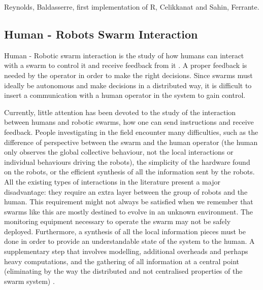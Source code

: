 \documentclass[oneside, a4paper, 12pt]{memoir}
\begin{document}
		
		Reynolds, Baldasserre, first implementation of R, Celikkanat and Sahin, Ferrante.
			
	\subsection{Human - Robots Swarm Interaction}

	
	Human - Robotic swarm interaction is the study of how humans can interact with a swarm to control it and receive feedback from it \citep{brambilla2013swarm}. A proper feedback is needed by the operator in order to make the right decisions. Since swarms must ideally be autonomous and make decisions in a distributed way, it is difficult to insert a communication with a human operator in the system to gain control.
	
	Currently, little attention has been devoted to the study of the interaction between humans and robotic swarms, how one can send instructions and receive feedback. People investigating in the field encounter many difficulties, such as the difference of perspective between the swarm and the human operator (the human only observes the global collective behaviour, not the local interactions or individual behaviours driving the robots), the simplicity of the hardware found on the robots, or the efficient synthesis of all the information sent by the robots. All the existing types of interactions in the literature present a major disadvantage: they require an extra layer between the group of robots and the human. This requirement might not always be satisfied when we remember that swarms like this are mostly destined to evolve in an unknown environment. The monitoring equipment necessary to operate the swarm may not be safely deployed. Furthermore, a synthesis of all the local information pieces must be done in order to provide an understandable state of the system to the human. A supplementary step that involves modelling, additional overheads and perhaps heavy computations, and the gathering of all information at a central point (eliminating by the way the distributed and not centralised properties of the swarm system) \citep{podevijn2012self}.
	
\end{document}
